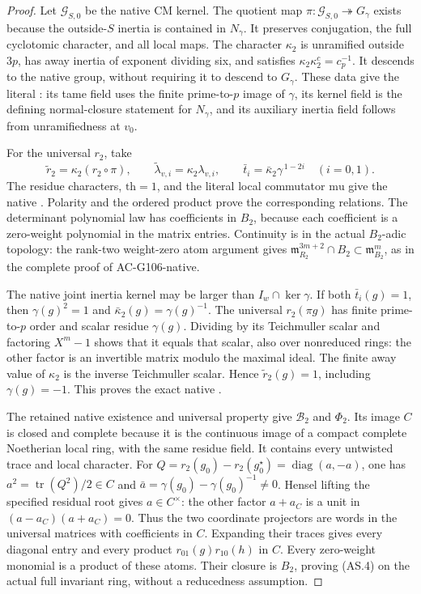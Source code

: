 \begin{proof}
Let \(\mathcal G_{S,0}\) be the native CM kernel.  The quotient
map
\(\pi:\mathcal G_{S,0}\twoheadrightarrow G_\gamma\)
exists because the outside-\(S\) inertia is contained in
\(N_\gamma\).  It preserves conjugation, the full cyclotomic
character, and all local maps.
The character \(\kappa_2\) is unramified outside \(3p\),
has away inertia of exponent dividing six, and satisfies
\(\kappa_2\kappa_2^c=c_p^{-1}\).
It descends to the native group, without requiring it to
descend to \(G_\gamma\).
These data give the literal : its tame field
uses the finite prime-to-\(p\) image of \(\gamma\), its
kernel field is the defining normal-closure statement for
\(N_\gamma\), and its auxiliary inertia field follows
from unramifiedness at \(v_0\).

For the universal \(r_2\), take
\[
 \widetilde r_2=\kappa_2(r_2\circ\pi),\qquad
 \widetilde\lambda_{v,i}=\kappa_2\lambda_{v,i},\qquad
 \bar t_i=\bar\kappa_2\gamma^{\,1-2i}\quad(i=0,1).
 \tag{AS.10}
\]
The residue characters, \(\mathrm{th}=1\), and the literal
local commutator \(\mathrm{mu}\) give the native .
Polarity and the ordered product prove the corresponding
 relations.  The determinant polynomial law has
coefficients in \(B_2\), because each coefficient is a
zero-weight polynomial in the matrix entries.  Continuity
is in the actual \(B_2\)-adic topology: the rank-two
weight-zero atom argument gives
\(\mathfrak m_{R_2}^{3m+2}\cap B_2\subset\mathfrak m_{B_2}^m\),
as in the complete proof of AC-G106-native.

The native joint inertia kernel may be larger than
\(I_w\cap\ker\gamma\).  If both \(\bar t_i(g)=1\), then
\(\gamma(g)^2=1\) and
\(\bar\kappa_2(g)=\gamma(g)^{-1}\).
The universal \(r_2(\pi g)\) has finite prime-to-\(p\)
order and scalar residue \(\gamma(g)\).
Dividing by its Teichmuller scalar and factoring \(X^m-1\)
shows that it equals that scalar, also over nonreduced rings:
the other factor is an invertible matrix modulo the maximal
ideal.  The finite away value of \(\kappa_2\) is the
inverse Teichmuller scalar.  Hence
\(\widetilde r_2(g)=1\), including \(\gamma(g)=-1\).
This proves the exact native .

The retained native existence and universal property give
\(\mathscr B_2\) and \(\Phi_2\).
Its image \(C\) is closed and complete because it is the
continuous image of a compact complete Noetherian local
ring, with the same residue field.  It contains every
untwisted trace and local character.
For \(Q=r_2(g_0)-r_2(g_0^\star)=\operatorname{diag}(a,-a)\),
one has \(a^2=\operatorname{tr}(Q^2)/2\in C\) and
\(\bar a=\gamma(g_0)-\gamma(g_0)^{-1}\ne0\).
Hensel lifting the specified residual root gives \(a\in C^\times\):
the other factor \(a+a_C\) is a unit in
\((a-a_C)(a+a_C)=0\).
Thus the two coordinate projectors are words in the universal
matrices with coefficients in \(C\).
Expanding their traces gives every diagonal entry and every
product \(r_{01}(g)r_{10}(h)\) in \(C\).
Every zero-weight monomial is a product of these atoms.
Their closure is \(B_2\), proving (AS.4) on the actual full
invariant ring, without a reducedness assumption.


\end{proof}
